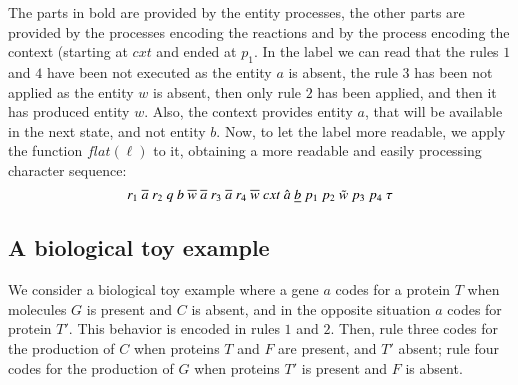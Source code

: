 The parts in bold are provided by the entity processes, the other parts are provided by the processes encoding the reactions and by the process encoding the context (starting at $cxt$ and ended at $p_1$.
In the label we can read that the rules $1$ and $4$ have been not executed as the entity $a$ is absent, 
the rule $3$ has been not applied as the entity $w$ is absent, then only rule $2$ has been applied, and then it has produced entity $w$. Also,  the context provides entity $a$, that will be available in the next state, and not entity $b$.
Now, to let the label more readable, we apply the function $flat(\ell)$ to it, obtaining a more readable and easily processing character sequence:
\[
r_1~\overline{a}~r_2~q~b~\overline{w}~\overline{a}~r_3~\overline{a}~r_4~\overline{w}~cxt~\hat{a}~\underline{b}~p_1~p_2~\tilde{w}~p_3~p_4~\tau\]


\subsection{A  biological toy example}\label{subsec:toy}

\noindent
We consider a biological toy example where a gene $a$  codes for a protein $T$ when molecules 
$G$ is present and $C$ is absent, and in the opposite situation $a$ codes for protein $T'$.
This behavior is encoded in rules $1$ and $2$.
Then, rule three codes for the production of $C$ when proteins $T$ and $F$ are present, and $T'$ absent;
rule four codes for the production of $G$ when  proteins $T'$ is present and $F$ is absent.
